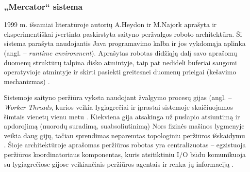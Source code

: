 \subsubsection{„Mercator“ sistema}

1999 m. išsamiai literatūroje autorių A.Heydon ir M.Najork aprašyta ir eksperimentiškai įvertinta paskirstyta saityno peržvalgos roboto architektūra. Ši sistema parašyta naudojantis Java programavimo kalba ir jos vykdomąja aplinka (angl. -- \textit{runtime environment}). Aprašytas robotas didžiąją dalį savo aprašomų duomenų struktūrų talpina disko atmintyje, taip pat nedideli buferiai saugomi operatyvioje atmintyje ir skirti pasiekti greitesnei duomenų prieigai (kešavimo mechanizmas) \cite{MercatorLiterature}.


Sistemoje saityno peržiūra vyksta naudojant žvalgymo procesų gijas (angl. -- \textit{Worker Threads}, kurios veikia lygiagrečiai ir įprastai sistemoje skaičiuojamos šimtais vienetų vienu metu \cite{MercatorLiterature}. Kiekviena gija atsakinga už puslapio atsiuntimą ir apdorojimą (nuorodų suradimą, suabsoliutinimą) Nors fizinės mašinos lygmenyje veikia daug gijų, tačiau sprendimas neparemtas topologiniu peržiūros išskaidymu \cite{MercatorLiterature}. Šioje architektūroje aprašomas peržiūros robotas yra centralizuotas -- egzistuoja peržiūros koordinatoriaus komponentas, kuris atsitiktiniu I/O būdu komunikuoja su lygiagrečiose gijose veikiančiais peržiūros agentais ir renka jų informaciją \cite{MercedCloudBasedWebCrawler}.
